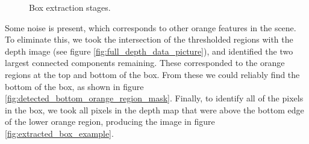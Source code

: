 \documentclass[12pt,a4paper,onecolumn]{article}
\begin{document}
\begin{figure}[h]
    \centering
      \quad

      \caption{Box extraction stages.}
\end{figure}

Some noise is present, which corresponds to other orange features in the scene.  To eliminate this, we took the intersection of the thresholded regions with the depth image (see figure \ref{fig:full_depth_data_picture}), and identified the two largest connected components remaining.  These corresponded to the orange regions at the top and bottom of the box.  From these we could reliably find the bottom of the box, as shown in figure \ref{fig:detected_bottom_orange_region_mask}.  Finally, to identify all of the pixels in the box, we took all pixels in the depth map that were above the bottom edge of the lower orange region, producing the image in figure \ref{fig:extracted_box_example}.
\end{document}
